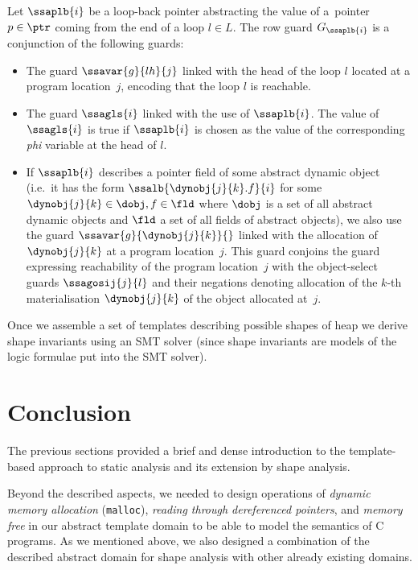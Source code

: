 {Let $\ssaplb{i}$ be a loop-back pointer abstracting the value of a~pointer $p
\in \ptr$ coming from the end of a loop $l \in L$. 
%
The row guard $G_{\ssaplb{i}}$ is a conjunction of the following guards:
\begin{itemize} 

  \item The guard $\ssavar{g}{lh}{j}$ linked with the head of the loop
    $l$ located at a program location~$j$, encoding that the
    loop $l$ is reachable.

  \item The guard $\ssagls{i}$ linked with the use of $\ssaplb{i}$. The value of
  $\ssagls{i}$ is true if $\ssaplb{i}$ is chosen as the value of the
  corresponding \emph{phi} variable at the head of $l$.

  \item If $\ssaplb{i}$ describes a pointer field of some abstract
    dynamic object (i.e.\ it has the form $\ssalb{\dynobj{j}{k}.f}{i}$
    for some $\dynobj{j}{k} \in \dobj, f \in \fld$ where $\dobj$ is a set of all abstract dynamic objects
    and $\fld$ a set of all fields of abstract objects), we also use the
    guard $\ssavar{g}{\dynobj{j}{k}}{}$ linked with the allocation of
    $\dynobj{j}{k}$ at a program location~$j$. This guard conjoins the
    guard expressing reachability of the program location~$j$ with the
    object-select guards $\ssagosij{j}{l}$ and their negations
    denoting allocation of the $k$-th materialisation $\dynobj{j}{k}$ of the
    object allocated at~$j$.
\end{itemize}

Once we assemble a set of templates describing possible shapes of heap we derive shape invariants
using an SMT solver (since shape invariants are models of the logic formulae put into
the SMT solver).

\section{Conclusion}
The previous sections provided a brief and dense introduction to the template-based
approach to static analysis and its extension by shape analysis.

Beyond the described aspects, we needed to design operations of \emph{dynamic memory allocation}
(\texttt{malloc}), \emph{reading through dereferenced pointers}, and \emph{memory free} in
our abstract template domain to be able to model the semantics of C programs.
As we mentioned above, we also designed a combination of the described abstract domain
for shape analysis with other already existing domains.

}
